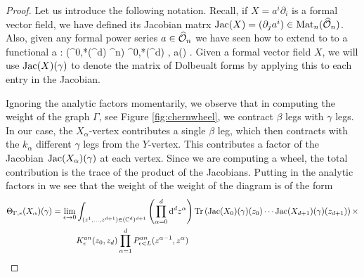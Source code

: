 \documentclass[10pt]{amsart}
\def\Jac{{\rm Jac}}
\begin{document}

\begin{proof}

Let us introduce the following notation. 
Recall, if $X = a^i \partial_i$ is a formal vector field, we have defined its Jacobian matrx $\Jac(X) = (\partial_j a^i) \in {\rm Mat}_n(\hO_n)$.
Also, given any formal power series $a \in \widehat{\mathcal O}_n$ we have seen how to extend to to a functional
\ben
a : \Sym(\Omega^{0,*}(\CC^d) \tensor \CC^n) \to \Omega^{0,*}(\CC^d) \;\; , \;\; \gamma \mapsto a(\gamma) .
\een
Given a formal vector field $X$, we will use $\Jac(X)(\gamma)$ to denote the matrix of Dolbeualt forms by applying this to each entry in the Jacobian.

Ignoring the analytic factors momentarily, 
we observe that in computing the weight of the graph $\Gamma$, see Figure \ref{fig:chernwheel},
we contract $\beta$ legs with $\gamma$ legs.
In our case, the $X_\alpha$-vertex contributes a single $\beta$ leg,
which then contracts with the $k_\alpha$ different $\gamma$ legs from the $Y$-vertex.
This contributes a factor of the Jacobian ${\rm Jac}(X_\alpha)(\gamma)$ at each vertex.
Since we are computing a wheel, the total contribution is the trace of the product of the Jacobians. 
Putting in the analytic factors in we see that the weight of the weight of the diagram is of the form
\begin{align*}
\Theta_{\Gamma,e}(X_\alpha) (\gamma) = \lim_{\epsilon \to 0} & \int_{(z^1,\ldots, z^{d+1}) \in (\CC^d)^{d+1}} \left(\prod_{\alpha=0}^d \d^d z^\alpha\right) \Tr\left(\Jac(X_0) (\gamma)(z_0) \cdots \Jac(X_{d+1})(\gamma)(z_{d+1})\right) \times \\
&  K^{an}_\epsilon(z_0,z_d) \prod_{\alpha = 1}^{d} P_{\epsilon < L}^{an}(z^{\alpha-1}, z^{\alpha}) 
\end{align*}


\end{proof}
\end{document}
